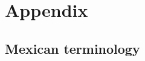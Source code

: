 \documentclass[letter,12pt]{article}
\begin{document}



\section{Appendix}

\subsection{Mexican terminology}
\end{document}
